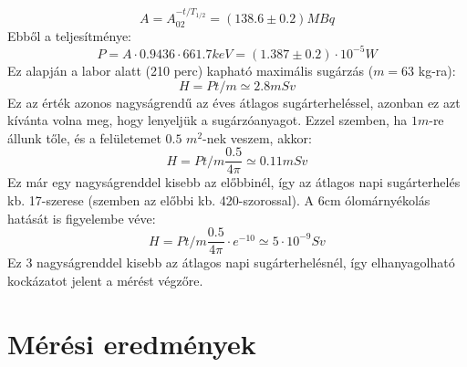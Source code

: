 \documentclass[a4paper,12pt]{article}
\begin{document}
\begin{equation}
	A=A_02^{-t/T_{1/2}}=(138.6\pm0.2)MBq
	\label{eq:akt}
\end{equation}
Ebből a teljesítménye:
\begin{equation}
	P=A\cdot 0.9436\cdot661.7 keV = (1.387\pm0.2)\cdot10^{-5}W
	\label{eq:power}
\end{equation}
Ez alapján a labor alatt (210 perc) kapható maximális sugárzás ($m=63$ kg-ra):
\begin{equation}
	H = Pt/m \simeq 2.8mSv
\end{equation}
Ez az érték azonos nagyságrendű az éves átlagos sugárterheléssel, azonban ez azt kívánta volna meg, hogy lenyeljük a sugárzóanyagot. Ezzel szemben, ha $1 m$-re állunk tőle, és a felületemet $0.5$ $m^2$-nek veszem, akkor:
\begin{equation}
	H = Pt/m \frac{0.5}{4\pi} \simeq 0.11 mSv
\end{equation}
Ez már egy nagyságrenddel kisebb az előbbinél, így az átlagos napi sugárterhelés kb. 17-szerese (szemben az előbbi kb. 420-szorossal).
A $6$cm ólomárnyékolás hatását is figyelembe véve:
\begin{equation}
	H = Pt/m \frac{0.5}{4\pi}\cdot e^{-10} \simeq 5\cdot 10^{-9}Sv
\end{equation}
Ez 3 nagyságrenddel kisebb az átlagos napi sugárterhelésnél, így elhanyagolható kockázatot jelent a mérést végzőre.

\newpage

\section*{Mérési eredmények}
\end{document}
